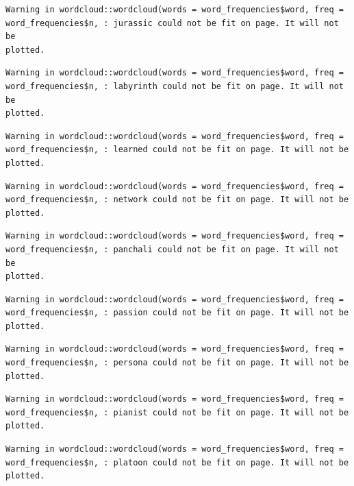 \documentclass[
  letterpaper,
]{krantz}
\begin{document}
\begin{verbatim}
Warning in wordcloud::wordcloud(words = word_frequencies$word, freq =
word_frequencies$n, : jurassic could not be fit on page. It will not be
plotted.
\end{verbatim}

\begin{verbatim}
Warning in wordcloud::wordcloud(words = word_frequencies$word, freq =
word_frequencies$n, : labyrinth could not be fit on page. It will not be
plotted.
\end{verbatim}

\begin{verbatim}
Warning in wordcloud::wordcloud(words = word_frequencies$word, freq =
word_frequencies$n, : learned could not be fit on page. It will not be plotted.
\end{verbatim}

\begin{verbatim}
Warning in wordcloud::wordcloud(words = word_frequencies$word, freq =
word_frequencies$n, : network could not be fit on page. It will not be plotted.
\end{verbatim}

\begin{verbatim}
Warning in wordcloud::wordcloud(words = word_frequencies$word, freq =
word_frequencies$n, : panchali could not be fit on page. It will not be
plotted.
\end{verbatim}

\begin{verbatim}
Warning in wordcloud::wordcloud(words = word_frequencies$word, freq =
word_frequencies$n, : passion could not be fit on page. It will not be plotted.
\end{verbatim}

\begin{verbatim}
Warning in wordcloud::wordcloud(words = word_frequencies$word, freq =
word_frequencies$n, : persona could not be fit on page. It will not be plotted.
\end{verbatim}

\begin{verbatim}
Warning in wordcloud::wordcloud(words = word_frequencies$word, freq =
word_frequencies$n, : pianist could not be fit on page. It will not be plotted.
\end{verbatim}

\begin{verbatim}
Warning in wordcloud::wordcloud(words = word_frequencies$word, freq =
word_frequencies$n, : platoon could not be fit on page. It will not be plotted.
\end{verbatim}
\end{document}
